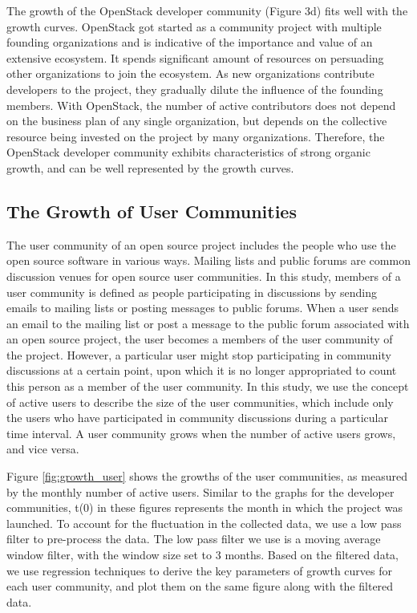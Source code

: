 \documentclass[conference]{IEEEtran}
\begin{document}
The growth of the OpenStack developer community (Figure 3d) fits well with the growth curves. OpenStack got started as a community project with multiple founding organizations and is indicative of the importance and value of an extensive ecosystem. It spends significant amount of resources on persuading other organizations to join the ecosystem. As new organizations contribute developers to the project, they gradually dilute the influence of the founding members. With OpenStack, the number of active contributors does not depend on the business plan of any single organization, but depends on the collective resource being invested on the project by many organizations. Therefore, the OpenStack developer community exhibits characteristics of strong organic growth, and can be well represented by the growth curves. 


\subsection{The Growth of User Communities}

The user community of an open source project includes the people who use the open source software in various ways. Mailing lists and public forums are common discussion venues for open source user communities. In this study, members of a user community is defined as people participating in discussions by sending emails to mailing lists or posting messages to public forums. When a user sends an email to the mailing list or post a message to the public forum associated with an open source project, the user becomes a members of the user community of the project. However, a particular user might stop participating in community discussions at a certain point, upon which it is no longer appropriated to count this person as a member of the user community. In this study, we use the concept of active users to describe the size of the user communities, which include only the users who have participated in community discussions during a particular time interval. A user community grows when the number of active users grows, and vice versa. 

Figure \ref{fig:growth_user} shows the growths of the user communities, as measured by the monthly number of active users. Similar to the graphs for the developer communities, t(0) in these figures represents the month in which the project was launched. To account for the fluctuation in the collected data, we use a low pass filter to pre-process the data. The low pass filter we use is a moving average window filter, with the window size set to 3 months. Based on the filtered data, we use regression techniques to derive the key parameters of growth curves for each user community, and plot them on the same figure along with the filtered data. 
\end{document}
